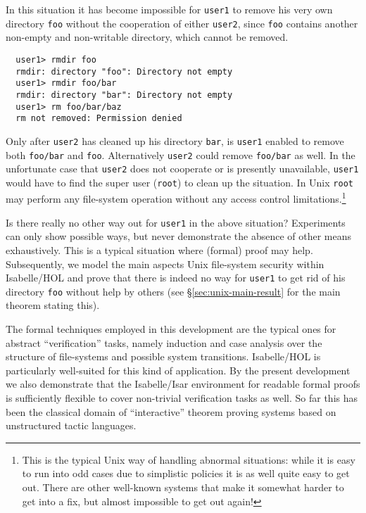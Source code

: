 \documentclass[11pt,a4paper]{article}
\newcommand{\secref}[1]{\S\ref{#1}}
\begin{document}
In this situation it has become impossible for \texttt{user1} to remove his
very own directory \texttt{foo} without the cooperation of either
\texttt{user2}, since \texttt{foo} contains another non-empty and non-writable
directory, which cannot be removed.

{\small
\begin{verbatim}
  user1> rmdir foo
  rmdir: directory "foo": Directory not empty
  user1> rmdir foo/bar
  rmdir: directory "bar": Directory not empty
  user1> rm foo/bar/baz
  rm not removed: Permission denied
\end{verbatim}
}

Only after \texttt{user2} has cleaned up his directory \texttt{bar}, is
\texttt{user1} enabled to remove both \texttt{foo/bar} and \texttt{foo}.
Alternatively \texttt{user2} could remove \texttt{foo/bar} as well.  In the
unfortunate case that \texttt{user2} does not cooperate or is presently
unavailable, \texttt{user1} would have to find the super user (\texttt{root})
to clean up the situation.  In Unix \texttt{root} may perform any file-system
operation without any access control limitations.\footnote{This is the typical
  Unix way of handling abnormal situations: while it is easy to run into odd
  cases due to simplistic policies it is as well quite easy to get out.  There
  are other well-known systems that make it somewhat harder to get into a fix,
  but almost impossible to get out again!}

\bigskip Is there really no other way out for \texttt{user1} in the above
situation?  Experiments can only show possible ways, but never demonstrate the
absence of other means exhaustively.  This is a typical situation where
(formal) proof may help.  Subsequently, we model the main aspects Unix
file-system security within Isabelle/HOL \cite{Nipkow-et-al:2000:HOL} and
prove that there is indeed no way for \texttt{user1} to get rid of his
directory \texttt{foo} without help by others (see
\secref{sec:unix-main-result} for the main theorem stating this).

\medskip The formal techniques employed in this development are the typical
ones for abstract ``verification'' tasks, namely induction and case analysis
over the structure of file-systems and possible system transitions.
Isabelle/HOL \cite{Nipkow-et-al:2000:HOL} is particularly well-suited for this
kind of application.  By the present development we also demonstrate that the
Isabelle/Isar environment \cite{Wenzel:1999:TPHOL,Wenzel:2002:isar-ref} for
readable formal proofs is sufficiently flexible to cover non-trivial
verification tasks as well.  So far this has been the classical domain of
``interactive'' theorem proving systems based on unstructured tactic
languages.






\end{document}
